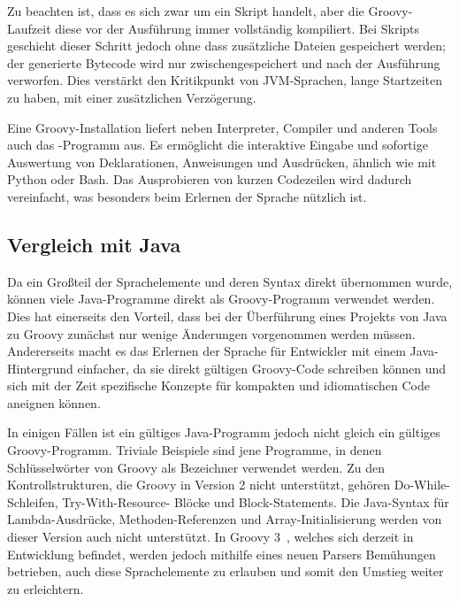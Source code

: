 \documentclass[a4paper]{article}
\begin{document}
Zu beachten ist, dass es sich zwar um ein Skript handelt, aber die Groovy-Laufzeit diese vor der Ausführung immer vollständig kompiliert.
Bei Skripts geschieht dieser Schritt jedoch ohne dass zusätzliche Dateien gespeichert werden;
der generierte Bytecode wird nur zwischengespeichert und nach der Ausführung verworfen.
Dies verstärkt den Kritikpunkt von JVM-Sprachen, lange Startzeiten zu haben, mit einer zusätzlichen Verzögerung.

Eine Groovy-Installation liefert neben Interpreter, Compiler und anderen Tools auch das -Programm aus.
Es ermöglicht die interaktive Eingabe und sofortige Auswertung von Deklarationen, Anweisungen und Ausdrücken, ähnlich wie mit Python oder Bash.
Das Ausprobieren von kurzen Codezeilen wird dadurch vereinfacht, was besonders beim Erlernen der Sprache nützlich ist.

\subsection{Vergleich mit Java}\label{subsec:vergleichMitJava}

Da ein Großteil der Sprachelemente und deren Syntax direkt übernommen wurde, können viele Java-Programme direkt als Groovy-Programm verwendet werden.
Dies hat einerseits den Vorteil, dass bei der Überführung eines Projekts von Java zu Groovy zunächst nur wenige Änderungen vorgenommen werden müssen.
Andererseits macht es das Erlernen der Sprache für Entwickler mit einem Java-Hintergrund einfacher, da sie direkt gültigen Groovy-Code schreiben können und sich mit der Zeit spezifische Konzepte für kompakten und idiomatischen Code aneignen können.

In einigen Fällen ist ein gültiges Java-Programm jedoch nicht gleich ein gültiges Groovy-Programm.
Triviale Beispiele sind jene Programme, in denen Schlüsselwörter von Groovy als Bezeichner verwendet werden.
Zu den Kontrollstrukturen, die Groovy in Version 2 nicht unterstützt, gehören Do-While-Schleifen, Try-With-Resource- Blöcke und Block-Statements.
Die Java-Syntax für Lambda-Ausdrücke, Methoden-Referenzen und Array-Initialisierung werden von dieser Version auch nicht unterstützt.
In Groovy 3~\cite{groovy-lang:release3}, welches sich derzeit in Entwicklung befindet, werden jedoch mithilfe eines neuen Parsers Bemühungen betrieben, auch diese Sprachelemente zu erlauben und somit den Umstieg weiter zu erleichtern.
\end{document}
